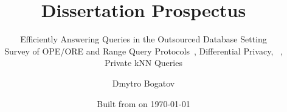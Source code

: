 \title{Dissertation Prospectus}

\subtitle{
	Efficiently Answering Queries in the Outsourced Database Setting \\
	{\small Survey of OPE/ORE and Range Query Protocols~\cite{ore-benchmark-17}, Differential Privacy, \epsolute{}~\cite{epsolute}, Private kNN Queries}
}

\date{Built from \href{https://git.dbogatov.org/bu/proposal/presentation/commit/\version}{\emph{\version}} on \today}

\author{Dmytro Bogatov \\ }


\def\wm{\begin{tabular}{c} Dmytro Bogatov \\ Boston University \end{tabular}}
